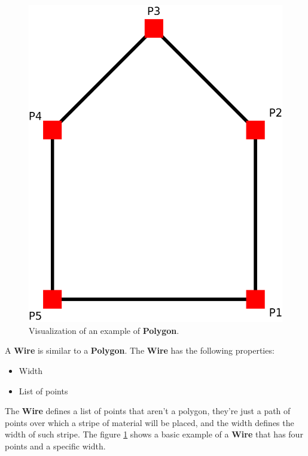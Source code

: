 \documentclass[11pt,twoside,openany,x11names,svgnames]{memoir}
\begin{document}
\begin{figure}
	\centering
	\label{fig:polygon}
	\includegraphics[scale=0.15, clip=true, trim= 0pt 0pt 0pt 0pt]{images/chapter03-image04}
	\caption{Visualization of an example of \textbf{Polygon}.}
\end{figure}

A \textbf{Wire} is similar to a \textbf{Polygon}. The \textbf{Wire} has the following properties:

\begin{itemize}
\item Width
\item List of points
\end{itemize}

The \textbf{Wire} defines a list of points that aren't a polygon, they're just a path of points over which a stripe of material will be placed, and the width defines the width of such stripe. The figure \ref{fig:polygon} shows a basic example of a \textbf{Wire} that has four points and a specific width.
\end{document}
